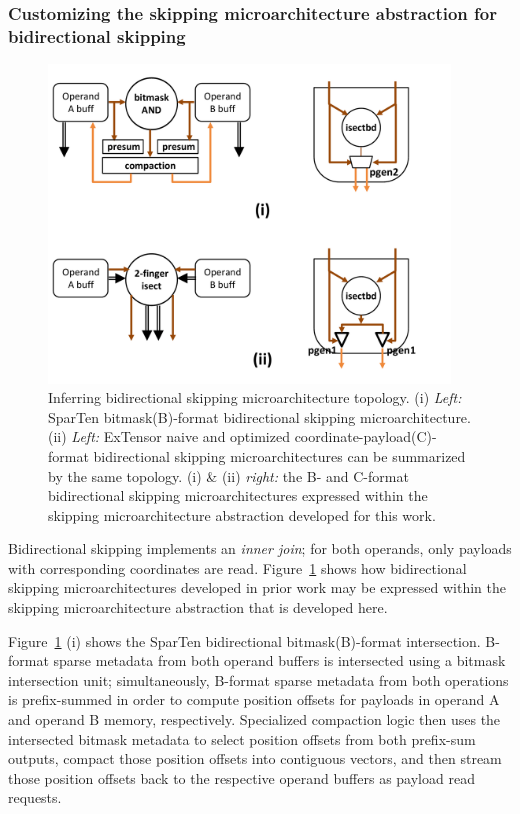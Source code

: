 \subsubsection{Customizing the skipping microarchitecture abstraction for bidirectional skipping}

\begin{figure}[ht]
    \centering
    \includegraphics[width=0.95\textwidth]{figures/prior_bd_skip.pdf}
    \caption{Inferring bidirectional skipping microarchitecture topology. (i) \textit{Left:} SparTen\cite{sparten} bitmask(B)-format bidirectional skipping microarchitecture. (ii) \textit{Left:} ExTensor\cite{extensor} naive and optimized coordinate-payload(C)-format bidirectional skipping microarchitectures can be summarized by the same topology. (i) \& (ii) \textit{right:} the B- and C-format bidirectional skipping microarchitectures expressed within the skipping microarchitecture abstraction developed for this work.}
    \label{fig:prior_bd_skip}
\end{figure}

Bidirectional skipping implements an \textit{inner join}; for both operands, only payloads with corresponding coordinates are read. Figure~\ref{fig:prior_bd_skip} shows how bidirectional skipping microarchitectures developed in prior work may be expressed within the skipping microarchitecture abstraction that is developed here. 

Figure~\ref{fig:prior_bd_skip} (i) shows the SparTen\cite{sparten} bidirectional bitmask(B)-format intersection. B-format sparse metadata from both operand buffers is intersected using a bitmask intersection unit; simultaneously, B-format sparse metadata from both operations is prefix-summed in order to compute position offsets for payloads in operand A and operand B memory, respectively. Specialized compaction logic then uses the intersected bitmask metadata to select position offsets from both prefix-sum outputs, compact those position offsets into contiguous vectors, and then stream those position offsets back to the respective operand buffers as payload read requests.

